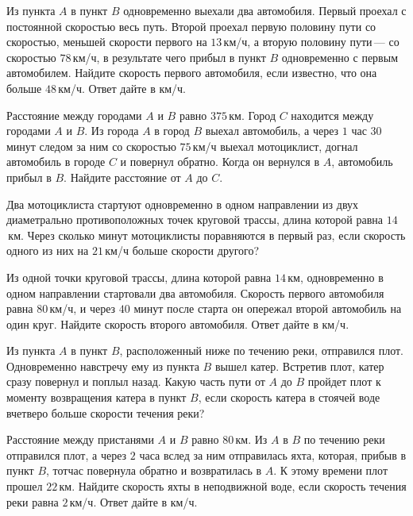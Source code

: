 \begin{consultation}
	\begin{listofex}
		\item Из пункта \(A\) в пункт \(B\) одновременно выехали два автомобиля. Первый проехал с постоянной скоростью весь путь. Второй проехал первую половину пути со скоростью, меньшей скорости первого на \(13\) км/ч, а вторую половину пути --- со скоростью \(78\) км/ч, в результате чего прибыл в пункт \(B\) одновременно с первым автомобилем. Найдите скорость первого автомобиля, если известно, что она больше \(48\) км/ч. Ответ дайте в км/ч.
		\item Расстояние между городами \( A \) и \( B \) равно \( 375 \) км. Город \( C \) находится между городами \( A \) и \( B \). Из города \( A \) в город \( B \) выехал автомобиль, а через \( 1 \) час \( 30 \) минут следом за ним со скоростью \( 75 \) км/ч выехал мотоциклист, догнал автомобиль в городе \( C \) и повернул обратно. Когда он вернулся в \( A \), автомобиль прибыл в \( B \). Найдите расстояние от \( A \) до \( C \).
		\item Два мотоциклиста стартуют одновременно в одном направлении из двух диаметрально противоположных точек круговой трассы, длина которой равна \(14\) км. Через сколько минут мотоциклисты поравняются в первый раз, если скорость одного из них на \(21\) км/ч больше скорости другого?
		\item Из одной точки круговой трассы, длина которой равна \(14\) км, одновременно в одном направлении стартовали два автомобиля. Скорость первого автомобиля равна \(80\) км/ч, и через \(40\) минут после старта он опережал второй автомобиль на один круг. Найдите скорость второго автомобиля. Ответ дайте в км/ч.
		\item Из пункта \( A \) в пункт \( B \), расположенный ниже по течению реки, отправился плот. Одновременно навстречу ему из пункта \( B \) вышел катер. Встретив плот, катер сразу повернул и поплыл назад. Какую часть пути от \( A \) до \( B \) пройдет плот к моменту возвращения катера в пункт \( B \), если скорость катера в стоячей воде вчетверо больше скорости течения реки?
		\item Расстояние между пристанями \( A \) и \( B \) равно \( 80 \) км. Из \( A \) в \( B \) по течению реки отправился плот, а через \( 2 \) часа вслед за ним отправилась яхта, которая, прибыв в пункт \( B \), тотчас повернула обратно и возвратилась в \( A \). К этому времени плот прошел \( 22 \) км. Найдите скорость яхты в неподвижной воде, если скорость течения реки равна \( 2 \) км/ч. Ответ дайте в км/ч.
	\end{listofex}
\end{consultation}
